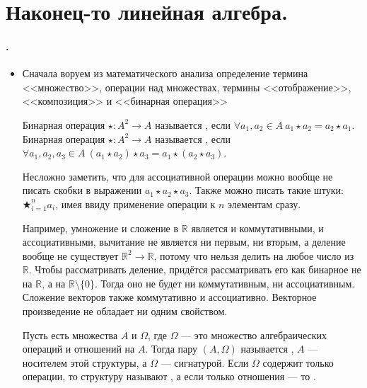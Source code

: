 \documentclass{article}
\begin{document}
    \section{Наконец-то линейная алгебра.}
    \paragraph{.}
    \begin{itemize}
        \item[]
        \begin{Comment}
            Сначала воруем из математического анализа определение термина <<множество>>, операции над множествах, термины <<отображение>>, <<композиция>> и <<бинарная операция>>
        \end{Comment}
        \dfn Бинарная операция $\star\colon A^2\to A$ называется , если $\forall a_1,a_2\in A~a_1\star a_2=a_2\star a_1$.
        \dfn Бинарная операция $\star\colon A^2\to A$ называется , если $\forall a_1,a_2,a_3\in A~(a_1\star a_2)\star a_3=a_1\star(a_2\star a_3)$.
        \begin{Comment}
            Несложно заметить, что для ассоциативной операции можно вообще не писать скобки в выражении $a_1\star a_2\star a_3$. Также можно писать такие штуки: $\bigstar_{i=1}^na_i$, имея ввиду применение операции к $n$ элементам сразу.
        \end{Comment}
        \begin{Example}
            Например, умножение и сложение в $\mathbb R$ является и коммутативными, и ассоциативными, вычитание не является ни первым, ни вторым, а деление вообще не существует $\mathbb R^2\to\mathbb R$, потому что нельзя делить на любое число из 
            $\mathbb R$. Чтобы рассматривать деление, придётся рассматривать его как бинарное не на $\mathbb R$, а на $\mathbb R\setminus\{0\}$. Тогда оно не будет ни коммутативным, ни ассоциативным.\\
            Сложение векторов также коммутативно и ассоциативно. Векторное произведение не обладает ни одним свойством.
        \end{Example}
        \dfn Пусть есть множества $A$ и $\Omega$, где $\Omega$ --- это множество алгебраических операций и отношений на $A$. Тогда пару $(A,\Omega)$ называется , $A$ --- носителем этой структуры, а $\Omega$ --- сигнатурой.
        \dfn Если $\Omega$ содержит только операции, то структуру называют , а если только отношения --- то .

\end{itemize}
\end{document}
